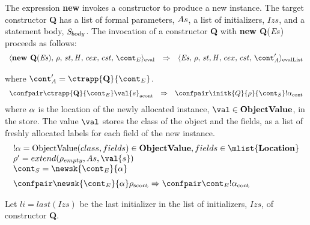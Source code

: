 \documentclass{article}
\begin{document}
The expression \textbf{new} invokes a constructor to produce a new instance. The target constructor \textbf{Q} has a list of formal parameters, $As$, a list of initializers, $Izs$, and a statement body, $\mathit{S}_{body}$. The invocation of a constructor \textbf{Q} with \textbf{new Q}($\mathit{E}\mathit{s}$) proceeds as follows:
\[
  \begin{array}{lcl}
	\evalconf{\textbf{new Q}(\exprs)}{\env}{st}{cex}{cst}{\econt}
	& \Rightarrow &
	\evallistconf{\exprs}{\env}{st}{cex}{cst}{\acont'}\\[2mm]
  \end{array}
\]
where $\acont' = \ctrapp{\textbf{Q}}{\econt}$.
\[
  \begin{array}{lcl}
	\acontconf{\ctrapp{\textbf{Q}}{\econt}}{\val{s}}
	& \Rightarrow &
	\contconf{\initk{Q}{\env}{\scont}}{!\loc}
  \end{array}
\]
\noindent
where $\alpha$ is the location of the newly allocated instance, $\val \in \dobjval$, in the store. The value $\val$ stores the class of the object and the fields, as a list of freshly allocated labels for each field of the new instance.
\[
  \begin{array}{l}
	\deref{\loc} = \objval \in \dobjval, fields \in \mlist{\dlocation}\\
	\env' = extend(\env_{empty}, \formals, \val{s})\\
	\scont = \newsk{\econt}{\loc} \\[2mm]

	\scontconf{\newsk{\econt}{\loc}}{\env}
	\Rightarrow
	\contconf{\econt}{\deref{\loc}}
  \end{array}
\]

\noindent
Let $li = last(Izs)$ be the last initializer in the list of initializers, $Izs$, of constructor \textbf{Q}.
\end{document}
